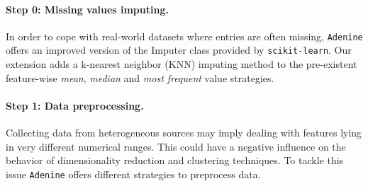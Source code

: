 \documentclass[twoside,11pt]{article}
\makeatletter
\newcommand{\ade}{\texttt{Adenine}\@\xspace}
\makeatother
\begin{document}
\paragraph{Step 0: Missing values imputing.}
  In order to cope with real-world datasets where entries are often missing, \ade offers an improved version of the Imputer class provided by \texttt{scikit-learn}. Our extension adds a k-nearest neighbor (KNN) imputing method to the pre-existent feature-wise \emph{mean}, \emph{median} and \emph{most frequent} value strategies. \citep{troyanskaya2001missing}
  

\paragraph{Step 1: Data preprocessing.}
  Collecting data from heterogeneous sources may imply dealing with features lying in very different numerical ranges. This could have a negative influence on the behavior of dimensionality reduction and clustering techniques. To tackle this issue \ade offers different strategies to preprocess data.
\end{document}
